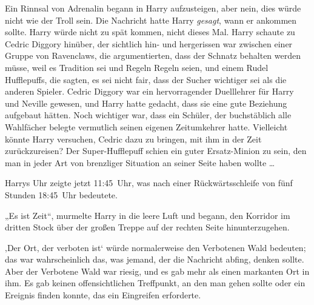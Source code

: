 Ein Rinnsal von Adrenalin begann in Harry aufzusteigen, aber nein, dies würde nicht wie der Troll sein. Die Nachricht hatte Harry \emph{gesagt}, wann er ankommen sollte. Harry würde nicht zu spät kommen, nicht dieses Mal. Harry schaute zu Cedric Diggory hinüber, der sichtlich hin- und hergerissen war zwischen einer Gruppe von Ravenclaws, die argumentierten, dass der Schnatz behalten werden müsse, weil es Tradition sei und Regeln Regeln seien, und einem Rudel Hufflepuffs, die sagten, es sei nicht fair, dass der Sucher wichtiger sei als die anderen Spieler. Cedric Diggory war ein hervorragender Duelllehrer für Harry und Neville gewesen, und Harry hatte gedacht, dass sie eine gute Beziehung aufgebaut hätten. Noch wichtiger war, dass ein Schüler, der buchstäblich alle Wahlfächer belegte vermutlich seinen eigenen Zeitumkehrer hatte. Vielleicht könnte Harry versuchen, Cedric dazu zu bringen, mit ihm in der Zeit zurückzureisen? Der Super-Hufflepuff schien ein guter Ersatz-Minion zu sein, den man in jeder Art von brenzliger Situation an seiner Seite haben wollte …


Harrys Uhr zeigte jetzt 11:45~Uhr, was nach einer Rückwärtsschleife von fünf Stunden 18:45~Uhr bedeutete.

„Es ist Zeit“, murmelte Harry in die leere Luft und begann, den Korridor im dritten Stock über der großen Treppe auf der rechten Seite hinunterzugehen.

‚Der Ort, der verboten ist‘ würde normalerweise den Verbotenen Wald bedeuten; das war wahrscheinlich das, was jemand, der die Nachricht abfing, denken sollte. Aber der Verbotene Wald war riesig, und es gab mehr als einen markanten Ort in ihm. Es gab keinen offensichtlichen Treffpunkt, an den man gehen sollte oder ein Ereignis finden konnte, das ein Eingreifen erforderte.

